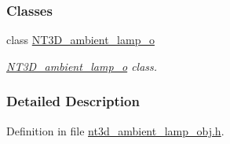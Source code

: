 \subsubsection*{Classes}
\begin{DoxyCompactItemize}
\item 
class \hyperlink{class_n_t3_d__ambient__lamp__o}{NT3D\_\-ambient\_\-lamp\_\-o}
\begin{DoxyCompactList}\small\item\em \hyperlink{class_n_t3_d__ambient__lamp__o}{NT3D\_\-ambient\_\-lamp\_\-o} class. \item\end{DoxyCompactList}\end{DoxyCompactItemize}


\subsubsection{Detailed Description}


Definition in file \hyperlink{nt3d__ambient__lamp__obj_8h_source}{nt3d\_\-ambient\_\-lamp\_\-obj.h}.

